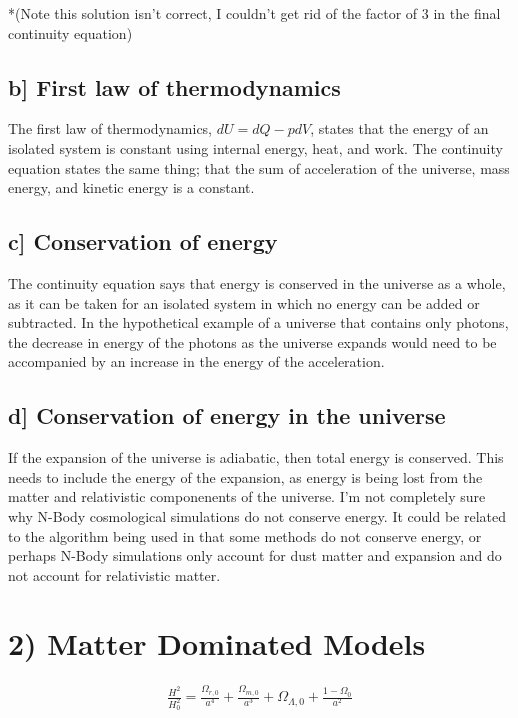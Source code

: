 \documentclass[a4paper,11pt]{article}
\begin{document}
*(Note this solution isn't correct, I couldn't get rid of the factor of 3 in the final continuity equation)

\subsection*{b] First law of thermodynamics}
The first law of thermodynamics, $dU=dQ-pdV$, states that the energy of an isolated system is constant using internal energy, heat, and work.  The continuity equation states the same thing; that the sum of acceleration of the universe, mass energy, and kinetic energy is a constant.  

\subsection*{c] Conservation of energy}
The continuity equation says that energy is conserved in the universe as a whole, as it can be taken for an isolated system in which no energy can be added or subtracted.  In the hypothetical example of a universe that contains only photons, the decrease in energy of the photons as the universe expands would need to be accompanied by an increase in the energy of the acceleration.  

\subsection*{d] Conservation of energy in the universe}
If the expansion of the universe is adiabatic, then total energy is conserved.  This needs to include the energy of the expansion, as energy is being lost from the matter and relativistic componenents of the universe.  I'm not completely sure why N-Body cosmological simulations do not conserve energy.  It could be related to the algorithm being used in that some methods do not conserve energy, or perhaps N-Body simulations only account for dust matter and expansion and do not account for relativistic matter.

\section*{2) Matter Dominated Models}
\begin{eqnarray}
\frac{H^2}{H_0^2}=\frac{\Omega_{r,0}}{a^4}+\frac{\Omega_{m,0}}{a^3}+\Omega_{\Lambda,0}+\frac{1-\Omega_0}{a^2}
\end{eqnarray}
\end{document}
